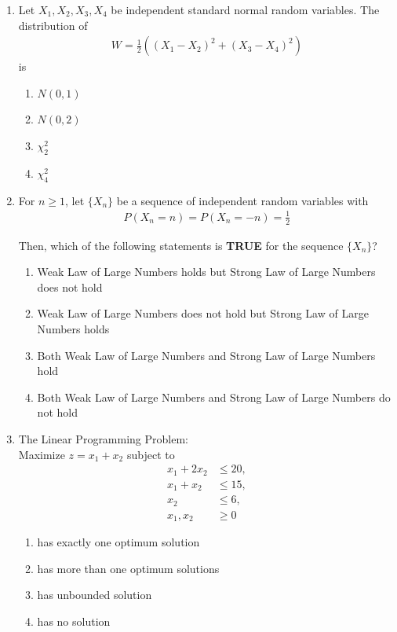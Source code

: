 \documentclass[journal]{IEEEtran}
\numberwithin{equation}{enumi}
\numberwithin{figure}{enumi}
\begin{document}
\begin{enumerate}
\item Let $X_1, X_2, X_3, X_4$ be independent standard normal random variables.  
The distribution of
\begin{align*}
W = \frac{1}{2} \left( (X_1 - X_2)^2 + (X_3 - X_4)^2 \right)
\end{align*}
is
\hfill{}
\begin{multicols}{4}
\begin{enumerate}
    \item $N(0, 1)$
    \item $N(0, 2)$
    \item $\chi^2_2$
    \item $\chi^2_4$
\end{enumerate}
\end{multicols}


\newpage

\item For $n \ge 1$, let $\{X_n\}$ be a sequence of independent random variables with
\begin{align*}
P(X_n = n) = P(X_n = -n) = \frac12
\end{align*}

Then, which of the following statements is \textbf{TRUE} for the sequence $\{X_n\}$?
\hfill{}

\begin{enumerate}
\item  Weak Law of Large Numbers holds but Strong Law of Large Numbers does not hold 
\item  Weak Law of Large Numbers does not hold but Strong Law of Large Numbers holds 
\item  Both Weak Law of Large Numbers and Strong Law of Large Numbers hold 
\item  Both Weak Law of Large Numbers and Strong Law of Large Numbers do not hold
 \end{enumerate}

\item  The Linear Programming Problem: \\
Maximize $z = x_1 + x_2$ 
subject to
\begin{align*}
x_1 + 2x_2 &\le 20, \\
x_1 + x_2 &\le 15, \\
x_2 &\le 6, \\
x_1, x_2 &\ge 0
\end{align*}
\hfill{}
\begin{multicols}{2}
\begin{enumerate}
\item  has exactly one optimum solution 
\item  has more than one optimum solutions  
\item  has unbounded solution 
\item  has no solution
\end{enumerate}
\end{multicols}



\end{enumerate}
\end{document}
